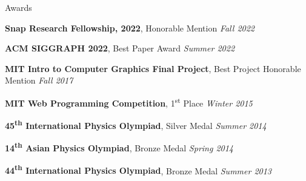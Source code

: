 \documentclass{resume}
\begin{document}

\begin{area}{Awards}
    \item \textbf{Snap Research Fellowship, 2022}, Honorable Mention \hfill \emph{Fall 2022}
    \item \textbf{ACM SIGGRAPH 2022}, Best Paper Award \hfill \emph{Summer 2022}
    \item \textbf{MIT Intro to Computer Graphics Final Project}, Best Project Honorable Mention \hfill \emph{Fall 2017}
    \item \textbf{MIT Web Programming Competition}, 1\textsuperscript{st} Place \hfill \emph{Winter 2015}
    \item \textbf{45\textsuperscript{th} International Physics Olympiad}, Silver Medal \hfill \emph{Summer 2014}
    \item \textbf{14\textsuperscript{th} Asian Physics Olympiad}, Bronze Medal \hfill \emph{Spring 2014}
    \item \textbf{44\textsuperscript{th} International Physics Olympiad}, Bronze Medal \hfill \emph{Summer 2013}
\end{area}
\end{document}
